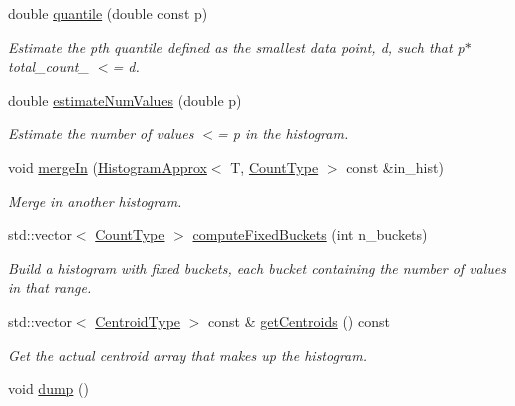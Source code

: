\begin{DoxyCompactItemize}
double \hyperlink{structvt_1_1util_1_1adt_1_1_histogram_approx_afbaecd0105590bf33bbf73611fea5a5c}{quantile} (double const p)
\begin{DoxyCompactList}\small\item\em Estimate the p\textquotesingle{}th quantile defined as the smallest data point, d, such that p$\ast$total\+\_\+count\+\_\+ $<$= d. \end{DoxyCompactList}\item 
double \hyperlink{structvt_1_1util_1_1adt_1_1_histogram_approx_adc37c23f9b9d846e4fb0f7b788cb54de}{estimate\+Num\+Values} (double p)
\begin{DoxyCompactList}\small\item\em Estimate the number of values $<$= p in the histogram. \end{DoxyCompactList}\item 
void \hyperlink{structvt_1_1util_1_1adt_1_1_histogram_approx_af3a3a4065892e90e346fdfbf6060dc9c}{merge\+In} (\hyperlink{structvt_1_1util_1_1adt_1_1_histogram_approx}{Histogram\+Approx}$<$ T, \hyperlink{structvt_1_1util_1_1adt_1_1_histogram_approx_aa2fb74665588d311da76dd821f2912c6}{Count\+Type} $>$ const \&in\+\_\+hist)
\begin{DoxyCompactList}\small\item\em Merge in another histogram. \end{DoxyCompactList}\item 
std\+::vector$<$ \hyperlink{structvt_1_1util_1_1adt_1_1_histogram_approx_aa2fb74665588d311da76dd821f2912c6}{Count\+Type} $>$ \hyperlink{structvt_1_1util_1_1adt_1_1_histogram_approx_a740842719c1af07e00fcfaa4093dc193}{compute\+Fixed\+Buckets} (int n\+\_\+buckets)
\begin{DoxyCompactList}\small\item\em Build a histogram with fixed buckets, each bucket containing the number of values in that range. \end{DoxyCompactList}\item 
std\+::vector$<$ \hyperlink{structvt_1_1util_1_1adt_1_1_histogram_approx_aabacbad5be3a407cb00938f079177b95}{Centroid\+Type} $>$ const  \& \hyperlink{structvt_1_1util_1_1adt_1_1_histogram_approx_ac23b01ef594bcdd86859becf7d81c3b2}{get\+Centroids} () const
\begin{DoxyCompactList}\small\item\em Get the actual centroid array that makes up the histogram. \end{DoxyCompactList}\item 
void \hyperlink{structvt_1_1util_1_1adt_1_1_histogram_approx_a26c7f2922772baf00c50dcf5e88ad023}{dump} ()

\end{DoxyCompactItemize}
